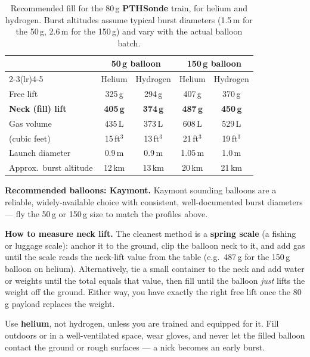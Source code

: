 \documentclass[11pt,openany]{report}
\newcommand{\PTH}{\texorpdfstring{\textbf{PTH}\textcolor{tlorange}{\textbf{Sonde}}}{PTHSonde}}
\begin{document}
\begin{table}[H]
\centering\small
\renewcommand{\arraystretch}{1.3}
\begin{tabular}{@{}l cc cc@{}}
\toprule
 & \multicolumn{2}{c}{\textbf{50\,g balloon}} & \multicolumn{2}{c}{\textbf{150\,g balloon}} \\
\cmidrule(lr){2-3}\cmidrule(lr){4-5}
 & Helium & Hydrogen & Helium & Hydrogen \\
\midrule
Free lift                 & 325\,g & 294\,g & 407\,g & 370\,g \\
\rowcolor{tlorange!12}
\textbf{Neck (fill) lift} & \textbf{405\,g} & \textbf{374\,g} & \textbf{487\,g} & \textbf{450\,g} \\
Gas volume                & 435\,L & 373\,L & 608\,L & 529\,L \\
\quad(cubic feet)         & 15\,ft$^3$ & 13\,ft$^3$ & 21\,ft$^3$ & 19\,ft$^3$ \\
Launch diameter           & 0.9\,m & 0.9\,m & 1.05\,m & 1.0\,m \\
Approx.\ burst altitude   & 12\,km & 13\,km & 20\,km & 21\,km \\
\bottomrule
\end{tabular}
\caption{Recommended fill for the 80\,g \PTH{} train, for helium and hydrogen. Burst
altitudes assume typical burst diameters (1.5\,m for the 50\,g, 2.6\,m for the 150\,g) and
vary with the actual balloon batch.}
\end{table}

\begin{note}
\textbf{Recommended balloons: Kaymont.} Kaymont sounding balloons are a reliable,
widely-available choice with consistent, well-documented burst diameters --- fly the
50\,g or 150\,g size to match the profiles above.
\end{note}

\begin{tip}
\textbf{How to measure neck lift.} The cleanest method is a \textbf{spring scale}
(a fishing or luggage scale): anchor it to the ground, clip the balloon neck to it,
and add gas until the scale reads the neck-lift value from the table (e.g.\ 487\,g for
the 150\,g balloon on helium). Alternatively, tie a small container to the neck and add
water or weights until the total equals that value, then fill until the balloon
\emph{just} lifts the weight off the ground. Either way, you have exactly the right free
lift once the 80\,g payload replaces the weight.
\end{tip}

\begin{warn}
Use \textbf{helium}, not hydrogen, unless you are trained and equipped for it.
Fill outdoors or in a well-ventilated space, wear gloves, and never let the filled
balloon contact the ground or rough surfaces --- a nick becomes an early burst.
\end{warn}
\end{document}
